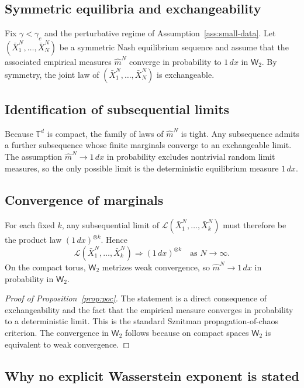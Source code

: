 \documentclass[11pt]{amsart}
\theoremstyle{definition}
\theoremstyle{remark}
\newcommand{\Td}{\mathbb{T}^d}
\newcommand{\cL}{\mathcal{L}}
\newcommand{\Wt}{\mathsf{W}_2}
\newcommand{\gamc}{\gamma_c}
\begin{document}
\subsection{Symmetric equilibria and exchangeability}
\label{sub:Nash-near}

Fix $\gamma<\gamc$ and the perturbative regime of Assumption~\ref{ass:small-data}. Let
$(\bar X_1^N,\dots,\bar X_N^N)$ be a symmetric Nash equilibrium sequence and assume that the associated empirical measures $\widehat m^N$ converge in probability to $1\,dx$ in $\Wt$.
By symmetry, the joint law of $(\bar X_1^N,\dots,\bar X_N^N)$ is exchangeable.

\subsection{Identification of subsequential limits}
\label{sub:coupling}

Because $\Td$ is compact, the family of laws of $\widehat m^N$ is tight.
Any subsequence admits a further subsequence whose finite marginals converge to an exchangeable limit. The assumption $\widehat m^N\to 1\,dx$ in probability excludes nontrivial random limit measures, so the only possible limit is the deterministic equilibrium measure $1\,dx$.

\subsection{Convergence of marginals}
\label{sub:marginals}

For each fixed $k$, any subsequential limit of
$\cL(\bar X_1^N,\dots,\bar X_k^N)$ must therefore be the product law $(1\,dx)^{\otimes k}$.
Hence
\[
\cL(\bar X_1^N,\dots,\bar X_k^N)\Rightarrow (1\,dx)^{\otimes k}
\quad\text{as }N\to\infty.
\]
On the compact torus, $\Wt$ metrizes weak convergence, so $\widehat m^N\to 1\,dx$ in probability in $\Wt$.

\begin{proof}[Proof of Proposition~\ref{prop:poc}]
The statement is a direct consequence of exchangeability and the fact that the empirical measure converges in probability to a deterministic limit. This is the standard Sznitman propagation-of-chaos criterion. The convergence in $\Wt$ follows because on compact spaces $\Wt$ is equivalent to weak convergence.
\end{proof}

\subsection{Why no explicit Wasserstein exponent is stated}
\label{sub:rate-remark}
\end{document}
